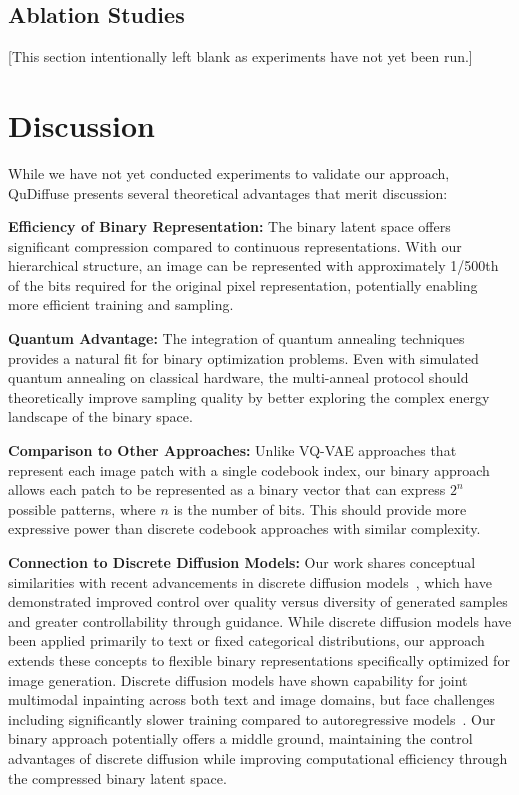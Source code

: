 \documentclass[10pt,twocolumn,letterpaper]{article}
\begin{document}
\subsection{Ablation Studies}
[This section intentionally left blank as experiments have not yet been run.]

\section{Discussion}
\label{sec:discussion}

While we have not yet conducted experiments to validate our approach, QuDiffuse presents several theoretical advantages that merit discussion:

\textbf{Efficiency of Binary Representation:} The binary latent space offers significant compression compared to continuous representations. With our hierarchical structure, an image can be represented with approximately 1/500th of the bits required for the original pixel representation, potentially enabling more efficient training and sampling.

\textbf{Quantum Advantage:} The integration of quantum annealing techniques provides a natural fit for binary optimization problems. Even with simulated quantum annealing on classical hardware, the multi-anneal protocol should theoretically improve sampling quality by better exploring the complex energy landscape of the binary space.

\textbf{Comparison to Other Approaches:} Unlike VQ-VAE approaches that represent each image patch with a single codebook index, our binary approach allows each patch to be represented as a binary vector that can express $2^n$ possible patterns, where $n$ is the number of bits. This should provide more expressive power than discrete codebook approaches with similar complexity.

\textbf{Connection to Discrete Diffusion Models:} Our work shares conceptual similarities with recent advancements in discrete diffusion models~\cite{austin2021structured}, which have demonstrated improved control over quality versus diversity of generated samples and greater controllability through guidance. While discrete diffusion models have been applied primarily to text or fixed categorical distributions, our approach extends these concepts to flexible binary representations specifically optimized for image generation. Discrete diffusion models have shown capability for joint multimodal inpainting across both text and image domains, but face challenges including significantly slower training compared to autoregressive models~\cite{austin2021structured}. Our binary approach potentially offers a middle ground, maintaining the control advantages of discrete diffusion while improving computational efficiency through the compressed binary latent space.
\end{document}
